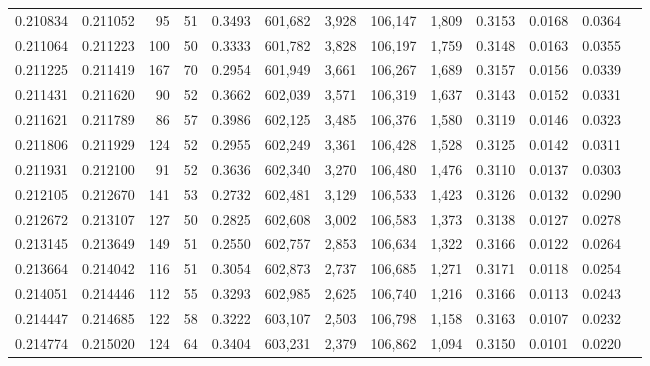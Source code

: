 \begin{tabular}{rrrrrrrrrrrrr}
0.210834 & 0.211052 &    95 &  51 &                                     0.3493 & 601,682 &   3,928 & 106,147 &   1,809 & 0.3153 & 0.0168 & 0.0364 \\
0.211064 & 0.211223 &   100 &  50 &                                     0.3333 & 601,782 &   3,828 & 106,197 &   1,759 & 0.3148 & 0.0163 & 0.0355 \\
0.211225 & 0.211419 &   167 &  70 &                                     0.2954 & 601,949 &   3,661 & 106,267 &   1,689 & 0.3157 & 0.0156 & 0.0339 \\
0.211431 & 0.211620 &    90 &  52 &                                     0.3662 & 602,039 &   3,571 & 106,319 &   1,637 & 0.3143 & 0.0152 & 0.0331 \\
0.211621 & 0.211789 &    86 &  57 &                                     0.3986 & 602,125 &   3,485 & 106,376 &   1,580 & 0.3119 & 0.0146 & 0.0323 \\
0.211806 & 0.211929 &   124 &  52 &                                     0.2955 & 602,249 &   3,361 & 106,428 &   1,528 & 0.3125 & 0.0142 & 0.0311 \\
0.211931 & 0.212100 &    91 &  52 &                                     0.3636 & 602,340 &   3,270 & 106,480 &   1,476 & 0.3110 & 0.0137 & 0.0303 \\
0.212105 & 0.212670 &   141 &  53 &                                     0.2732 & 602,481 &   3,129 & 106,533 &   1,423 & 0.3126 & 0.0132 & 0.0290 \\
0.212672 & 0.213107 &   127 &  50 &                                     0.2825 & 602,608 &   3,002 & 106,583 &   1,373 & 0.3138 & 0.0127 & 0.0278 \\
0.213145 & 0.213649 &   149 &  51 &                                     0.2550 & 602,757 &   2,853 & 106,634 &   1,322 & 0.3166 & 0.0122 & 0.0264 \\
0.213664 & 0.214042 &   116 &  51 &                                     0.3054 & 602,873 &   2,737 & 106,685 &   1,271 & 0.3171 & 0.0118 & 0.0254 \\
0.214051 & 0.214446 &   112 &  55 &                                     0.3293 & 602,985 &   2,625 & 106,740 &   1,216 & 0.3166 & 0.0113 & 0.0243 \\
0.214447 & 0.214685 &   122 &  58 &                                     0.3222 & 603,107 &   2,503 & 106,798 &   1,158 & 0.3163 & 0.0107 & 0.0232 \\
0.214774 & 0.215020 &   124 &  64 &                                     0.3404 & 603,231 &   2,379 & 106,862 &   1,094 & 0.3150 & 0.0101 & 0.0220 \\

\end{tabular}
